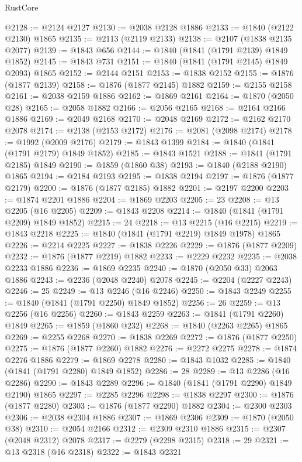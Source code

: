 \begin{lexlean}{RustCore}
\begin{coremodule}
@2128 := @2124 @2127
@2130 := @2038 @2128 @1886
@2133 := @1840 (@2122 @2130) @1865
@2135 := @2113 (@2119 @2133)
@2138 := @2107 (@1838 @2135 @2077)
@2139 := @1843 @656
@2144 := @1840 (@1841 (@1791 @2139) @1849 @1852)
@2145 := @1843 @731
@2151 := @1840 (@1841 (@1791 @2145) @1849 @2093) @1865
@2152 := @2144 @2151
@2153 := @1838 @2152
@2155 := @1876 (@1877 @2139)
@2158 := @1876 (@1877 @2145) @1882
@2159 := @2155 @2158
@2161 := @2038 @2159 @1886
@2162 := @1869 @2161
@2164 := @1870 (@2050 @28)
@2165 := @2058 @1882
@2166 := @2056 @2165
@2168 := @2164 @2166 @1886
@2169 := @2049 @2168
@2170 := @2048 @2169
@2172 := @2162 @2170 @2078
@2174 := @2138 (@2153 @2172)
@2176 := @2081 (@2098 @2174)
@2178 := @1992 (@2009 @2176)
@2179 := @1843 @1399
@2184 := @1840 (@1841 (@1791 @2179) @1849 @1852)
@2185 := @1843 @1521
@2188 := @1841 (@1791 @2185) @1849
@2190 := @1859 (@1860 @38)
@2193 := @1840 (@2188 @2190) @1865
@2194 := @2184 @2193
@2195 := @1838 @2194
@2197 := @1876 (@1877 @2179)
@2200 := @1876 (@1877 @2185) @1882
@2201 := @2197 @2200
@2203 := @1874 @2201 @1886
@2204 := @1869 @2203
@2205 := 23
@2208 := @13 @2205 (@16 @2205)
@2209 := @1843 @2208
@2214 := @1840 (@1841 (@1791 @2209) @1849 @1852)
@2215 := 24
@2218 := @13 @2215 (@16 @2215)
@2219 := @1843 @2218
@2225 := @1840 (@1841 (@1791 @2219) @1849 @1978) @1865
@2226 := @2214 @2225
@2227 := @1838 @2226
@2229 := @1876 (@1877 @2209)
@2232 := @1876 (@1877 @2219) @1882
@2233 := @2229 @2232
@2235 := @2038 @2233 @1886
@2236 := @1869 @2235
@2240 := @1870 (@2050 @33) @2063 @1886
@2243 := @2236 (@2048 @2240) @2078
@2245 := @2204 (@2227 @2243)
@2246 := 25
@2249 := @13 @2246 (@16 @2246)
@2250 := @1843 @2249
@2255 := @1840 (@1841 (@1791 @2250) @1849 @1852)
@2256 := 26
@2259 := @13 @2256 (@16 @2256)
@2260 := @1843 @2259
@2263 := @1841 (@1791 @2260) @1849
@2265 := @1859 (@1860 @232)
@2268 := @1840 (@2263 @2265) @1865
@2269 := @2255 @2268
@2270 := @1838 @2269
@2272 := @1876 (@1877 @2250)
@2275 := @1876 (@1877 @2260) @1882
@2276 := @2272 @2275
@2278 := @1874 @2276 @1886
@2279 := @1869 @2278
@2280 := @1843 @1032
@2285 := @1840 (@1841 (@1791 @2280) @1849 @1852)
@2286 := 28
@2289 := @13 @2286 (@16 @2286)
@2290 := @1843 @2289
@2296 := @1840 (@1841 (@1791 @2290) @1849 @2190) @1865
@2297 := @2285 @2296
@2298 := @1838 @2297
@2300 := @1876 (@1877 @2280)
@2303 := @1876 (@1877 @2290) @1882
@2304 := @2300 @2303
@2306 := @2038 @2304 @1886
@2307 := @1869 @2306
@2309 := @1870 (@2050 @38)
@2310 := @2054 @2166
@2312 := @2309 @2310 @1886
@2315 := @2307 (@2048 @2312) @2078
@2317 := @2279 (@2298 @2315)
@2318 := 29
@2321 := @13 @2318 (@16 @2318)
@2322 := @1843 @2321

\end{coremodule}
\end{lexlean}
